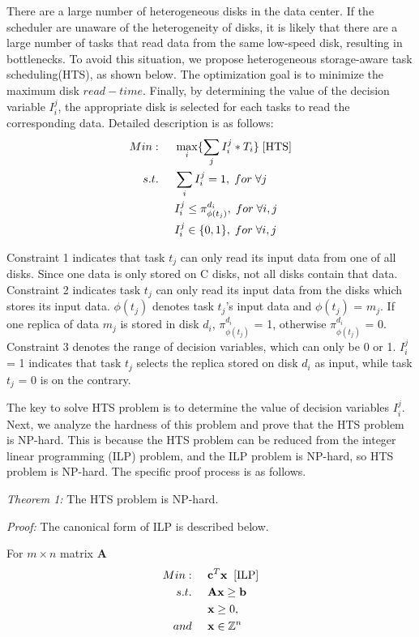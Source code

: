 \documentclass[conference]{IEEEtran}
\begin{document}
There are a large number of heterogeneous disks in the data center. If the scheduler are unaware of the heterogeneity of disks, it is likely that there are a large number of tasks that read data from the same low-speed disk, resulting in bottlenecks. To avoid this situation, we propose heterogeneous storage-aware task scheduling(HTS), as shown below. The optimization goal is to minimize the maximum disk $read-time$. Finally, by determining the value of the decision variable $I_i^j$, the appropriate disk is selected for each tasks to read the corresponding data. Detailed description is as follows:
\begin{align}
Min:&\;\;\;\;\;\max\limits_{i}\{\sum_{j}I_i^j*T_i\}\;[\rm{HTS}]\nonumber\\
s.t. 
&\;\;\;\;\;\sum_{i}I_i^j = 1,\;for\;\forall j\label{task-cons}\\
&\;\;\;\;\;I_i^j \leq \pi_{\phi(t_j)}^{d_i},\;for\;\forall i,j\label{data-cons}\\
&\;\;\;\;\;I_i^j\in\{0,1\},\;for\;\forall i,j\label{def-cons}
\end{align}

Constraint 1 indicates that task $t_j$ can only read its input data from one of all disks. Since one data is only stored on C disks, not all disks contain that data. Constraint 2 indicates task $t_j$ can only read its input data from the disks which stores its input data. $\phi(t_j)$ denotes task $t_j$'s input data and $\phi(t_j)$ = $m_j$. If one replica of data $m_j$ is stored in disk $d_i$, $\pi_{\phi(t_j)}^{d_i}$ = 1, otherwise $\pi_{\phi(t_j)}^{d_i}$ = 0. Constraint 3 denotes the range of decision variables, which can only be 0 or 1. $I_i^j$ = 1 indicates that task $t_j$ selects the replica stored on disk $d_i$ as input, while task $t_j$ = 0 is on the contrary.

The key to solve HTS problem is to determine the value of decision variables {$I_i^j$}. Next, we analyze the hardness of this problem and prove that the HTS problem is NP-hard. This is because the HTS problem can be reduced from the integer linear programming (ILP) problem, and the ILP problem is NP-hard, so HTS problem is NP-hard. The specific proof process is as follows.

\emph{Theorem 1:} The HTS problem is NP-hard.

\emph{Proof:}
The canonical form \cite{b11} of ILP is described below.

For $m\times n$ matrix \textbf{A}
\begin{align}
Min:&\;\;\;\;\;\textbf{c}^T\textbf{x}\;\;[\rm{ILP}]\label{ILP}\\
s.t. 
&\;\;\;\;\;\textbf{A}\textbf{x}\geq \textbf{b}\nonumber\\
&\;\;\;\;\;\textbf{x} \geq0,\nonumber\\ 
and
&\;\;\;\;\;\textbf{x} \in \mathbb{Z}^n\nonumber
\end{align}
\end{document}
